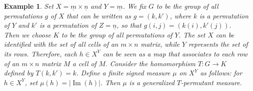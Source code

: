 \documentclass[11pt]{article}
\newcommand{\im}{\mathrm{Im}}
\newcommand{\patrizio}[1]{\textcolor{purple}{#1}}
\newtheorem{es}[theorem]{Example}
\begin{document}


\begin{es}\label{newexample1}
Set $X=\underline{m}\times\underline{n}$ and $Y=\underline{m}$.
We fix $G$ to be the group of all permutations $g$ of $X$ that can be written as
$g=(k,k')$,
where $k$ is a permutation of $Y$ and $k'$ is a permutation of $Z=\underline{n}$, so that 
$g(i,j)=(k(i),k'(j))$.
Then we choose $K$ to be the group of all permutations of $Y$.
The set $X$ can be identified with the set of all cells of an $m\times n$ matrix, while $Y$ represents the set of its rows. Therefore, each $h\in X^{Y}$ can be seen as a map that associates to each row of an $m\times n$ matrix $M$ a cell of $M$.
Consider the homomorphism $T\colon G\to K$
defined by $T(k,k')=k$.
Define a finite signed measure $\mu$ on $X^{Y}$ as follows: for $h\in X^{Y}$, set $\mu(h)=|\operatorname{Im}(h)|$. Then $\mu$ is a generalized $T$-permutant measure.
\end{es}
\end{document}
